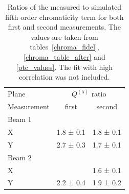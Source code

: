 \begin{table}[tbh]
    \centering
    \begin{tabular}{|l||c|c|}
    \hline
        Plane     &  \multicolumn{2}{c|}{$Q^{(5)}$ ratio} \\
        \cline{2-3}
        Measurement &    first   &    second\\ \hline\hline
        Beam 1    &            & \\
        X         &1.8 ± 0.1  & 1.8 ± 0.1  \\
        Y         & 2.7 ± 0.3  & 1.7 ± 0.1  \\ \hline
        Beam 2    &            & \\ 
        X         &            & 1.6 ± 0.1  \\
        Y         & 2.2 ± 0.4  & 1.9 ± 0.2 \\ \hline
    \end{tabular}
    \caption{Ratios of the measured to simulated fifth order chromaticity term for both first and second measurements.  The values are taken from tables~\ref{chroma_fidel}, \ref{chroma_table_after} and \ref{ptc_values}. The fit with high correlation was not included.}
    \label{ptc_values_ratios}
\end{table}


